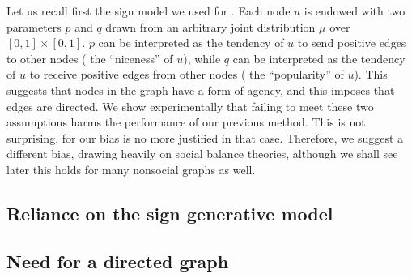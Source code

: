 Let us recall first the sign model we used for \dssn{}. Each node $u$ is endowed with two parameters
$p$ and $q$ drawn from an arbitrary joint distribution $\mu$ over $[0,1]\times [0,1]$. $p$ can be
interpreted as the tendency of $u$ to send positive edges to other nodes (\ie{} the
\enquote{niceness} of $u$), while $q$ can be interpreted as the tendency of $u$ to receive positive
edges from other nodes (\ie{} the \enquote{popularity} of $u$). This suggests that nodes in the
graph have a form of agency, and this imposes that edges are directed. We show experimentally that
failing to meet these two assumptions harms the performance of our previous method. This is not
surprising, for our bias is no more justified in that case. Therefore, we suggest a different bias,
drawing heavily on social balance theories, although we shall see later this holds for many
nonsocial graphs as well.

\subsection{Reliance on the sign generative model}
\label{sub:reliance_on_the_sign_generative_model}



\subsection{Need for a directed graph}
\label{sub:need_for_a_directed_graph}


